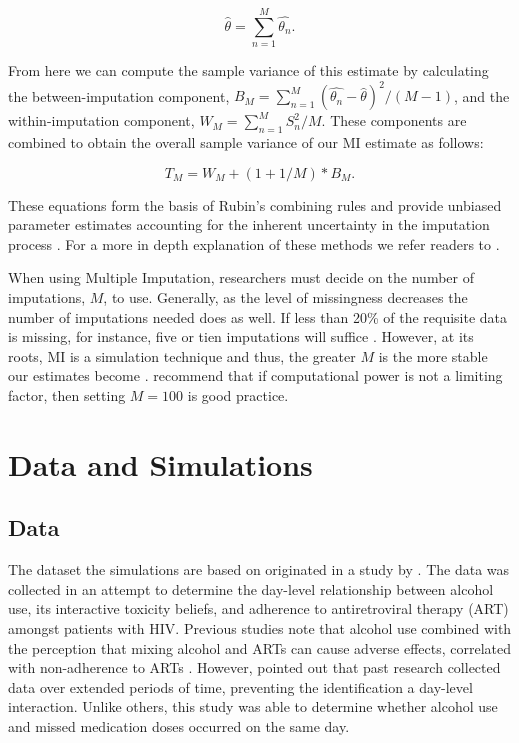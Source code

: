 \documentclass{svjour3}\usepackage[]{graphicx}\usepackage[]{color}
\begin{document}
\begin{equation}
\widehat{\theta} = \sum_{n=1}^{M} \widehat{\theta_n}.
\end{equation}

From here we can compute the sample variance of this estimate by calculating the between-imputation component, $B_M = \sum_{n=1}^{M} (\widehat{\theta_n} - \widehat{\theta})^2 / (M-1)$, and the within-imputation component, $W_M = \sum_{n=1}^{M} S_n^2 / M$. These components are combined to obtain the overall sample variance of our MI estimate as follows:

\begin{equation}
T_M = W_M + (1+1/M)*B_M.
\end{equation}

These equations form the basis of Rubin's combining rules and provide unbiased parameter estimates accounting for the inherent uncertainty in the imputation process \citep{raghunathan2015missing}. For a more in depth explanation of these methods we refer readers to \citet{little2014statistical}. \par

When using Multiple Imputation, researchers must decide on the number of imputations, $M$, to use. Generally, as the level of missingness decreases the number of imputations needed does as well. If less than 20\% of the requisite data is missing, for instance, five or tien imputations will suffice \citep{raghunathan2015missing}. However, at its roots, MI is a simulation technique and thus, the greater $M$ is the more stable our estimates become \citep{harel2007inferences}. \citet{graham2007many} recommend that if computational power is not a limiting factor, then setting $M=100$ is good practice. \par

\section{Data and Simulations}
\label{sec:2}
\subsection{Data}
\label{sec:2.1}
The dataset the simulations are based on originated in a study by \citet{pellowski2016alcohol}. The data was collected in an attempt to determine the day-level relationship between alcohol use, its interactive toxicity beliefs, and adherence to antiretroviral therapy (ART) amongst patients with HIV. Previous studies note that alcohol use combined with the perception that mixing alcohol and ARTs can cause adverse effects, correlated with non-adherence to ARTs \citep{kalichman2009prevalence, kalichman2012alcohol}. However, \citet{pellowski2016alcohol} pointed out that past research collected data over extended periods of time, preventing the identification a day-level interaction. Unlike others, this study was able to determine whether alcohol use and missed medication doses occurred on the same day. \par
\end{document}
